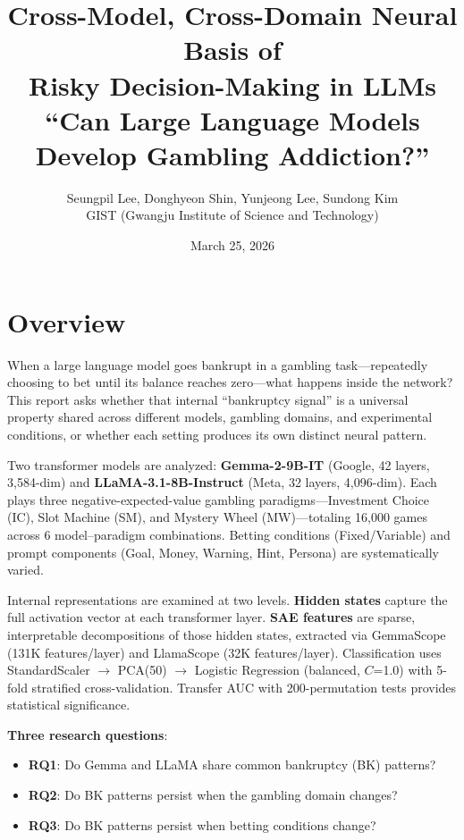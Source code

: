 \documentclass[11pt,a4paper]{article}
\title{\textbf{Cross-Model, Cross-Domain Neural Basis of\\Risky Decision-Making in LLMs}\\[0.3em]
\normalsize ``Can Large Language Models Develop Gambling Addiction?''}
\author{Seungpil Lee, Donghyeon Shin, Yunjeong Lee, Sundong Kim\\
\small GIST (Gwangju Institute of Science and Technology)}
\date{March 25, 2026}
\begin{document}
\maketitle
\tableofcontents
\newpage

\section*{Overview}

When a large language model goes bankrupt in a gambling task---repeatedly choosing to bet until its balance reaches zero---what happens inside the network? This report asks whether that internal ``bankruptcy signal'' is a universal property shared across different models, gambling domains, and experimental conditions, or whether each setting produces its own distinct neural pattern.

Two transformer models are analyzed: \textbf{Gemma-2-9B-IT} (Google, 42 layers, 3{,}584-dim) and \textbf{LLaMA-3.1-8B-Instruct} (Meta, 32 layers, 4{,}096-dim). Each plays three negative-expected-value gambling paradigms---Investment Choice (IC), Slot Machine (SM), and Mystery Wheel (MW)---totaling 16{,}000 games across 6 model--paradigm combinations. Betting conditions (Fixed/Variable) and prompt components (Goal, Money, Warning, Hint, Persona) are systematically varied.

Internal representations are examined at two levels. \textbf{Hidden states} capture the full activation vector at each transformer layer. \textbf{SAE features} are sparse, interpretable decompositions of those hidden states, extracted via GemmaScope (131K features/layer) and LlamaScope (32K features/layer). Classification uses StandardScaler $\rightarrow$ PCA(50) $\rightarrow$ Logistic Regression (balanced, $C$=1.0) with 5-fold stratified cross-validation. Transfer AUC with 200-permutation tests provides statistical significance.

\textbf{Three research questions}:
\begin{itemize}[nosep]
    \item \textbf{RQ1}: Do Gemma and LLaMA share common bankruptcy (BK) patterns?
    \item \textbf{RQ2}: Do BK patterns persist when the gambling domain changes?
    \item \textbf{RQ3}: Do BK patterns persist when betting conditions change?
\end{itemize}
\end{document}
